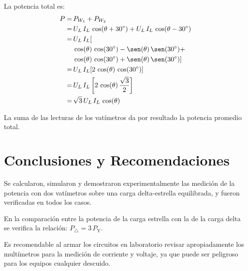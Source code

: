 \documentclass[letter,11pt]{article}
\begin{document}
\begin{enumerate}
La potencia total es:
\begin{equation*}
    \begin{split}
        P =\,& P_{W_1} + P_{W_2}\\
          =\,& U_L\,I_L\,\cos(\theta + 30^{\circ})+
               U_L\,I_L\,\cos(\theta - 30^{\circ})\\
          =\,& U_L\,I_L[\\
             & \cos(\theta)\,\cos(30^{\circ})-\sen(\theta)\,\sen(30^{\circ})+\\
             & \cos(\theta)\,\cos(30^{\circ})+\sen(\theta)\,\sen(30^{\circ})]\\
          =\,& U_L\,I_L[2\,\cos(\theta)\,\cos(30^{\circ})]\\
          =\,& U_L\,I_L\left[2\,\cos(\theta)\,\frac{\sqrt{3}}{2}\right]\\
          =\,& \sqrt{3}\,U_L\,I_L\,\cos(\theta)\\
    \end{split}
\end{equation*}

La suma de las lecturas de los vatímetros da por resultado la potencia promedio
total.

\end{enumerate}

\section{Conclusiones y Recomendaciones}
Se calcularon, simularon y demostraron experimentalmente las medición de la
potencia con dos vatímetros sobre una carga delta-estrella equilibrada, y fueron
verificadas en todos los casos.

En la comparación entre la potencia de la carga estrella con la de la carga
delta se verifica la relación: $P_{\triangle} = 3\,P_{\text{Y}}$.

Es recomendable al armar los circuitos en laboratorio revisar apropiadamente los
multímetros para la medición de corriente y voltaje, ya que puede ser peligroso
para los equipos cualquier descuido.
\end{document}

